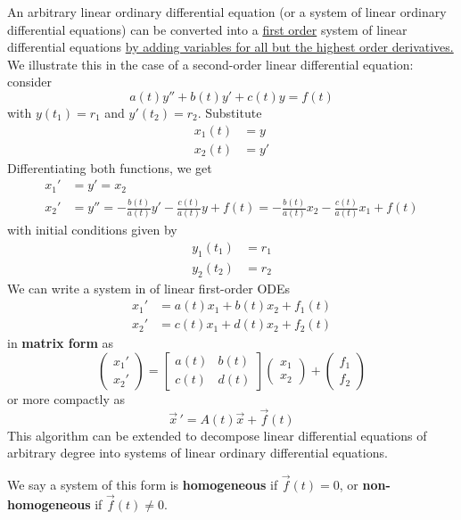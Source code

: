 \documentclass[12pt]{article}
\begin{document}
An arbitrary linear ordinary differential equation (or a system of linear ordinary differential equations) can be converted into a \uline{first order} system of linear differential equations \uline{by adding variables for all but the highest order derivatives.} We illustrate this in the case of a second-order linear differential equation: consider $$a(t)y'' + b(t)y' + c(t)y = f(t)$$ with $y(t_1) = r_1$ and $y'(t_2) = r_2$. Substitute $$\begin{aligned}
    x_1(t) &= y\\
    x_2(t) &= y'
\end{aligned}$$ Differentiating both functions, we get $$\begin{aligned}
    x_1' &= y' = x_2\\
    x_2' &= y'' = -\frac{b(t)}{a(t)}y' - \frac{c(t)}{a(t)}y + f(t) = -\frac{b(t)}{a(t)}x_2  - \frac{c(t)}{a(t)}x_1 + f(t)
\end{aligned}$$ with initial conditions given by $$\begin{aligned}
    y_1(t_1) &= r_1\\
    y_2(t_2) &= r_2
\end{aligned}$$ We can write a system in of linear first-order ODEs $$\begin{aligned}
    x_1' &= a(t)x_1 + b(t)x_2 + f_1(t)\\
    x_2' &= c(t)x_1 + d(t)x_2 + f_2(t)
\end{aligned}$$ in \textbf{matrix form} as $$\begin{pmatrix}
    x_1'\\x_2'
\end{pmatrix} = \begin{bmatrix}
    a(t) & b(t)\\
    c(t) & d(t)
\end{bmatrix} \begin{pmatrix}
    x_1\\x_2
\end{pmatrix} + \begin{pmatrix}
    f_1\\f_2
\end{pmatrix}$$ or more compactly as $$\vec{x} \, ' = A(t) \vec{x} + \vec{f}(t) $$ This algorithm can be extended to decompose linear differential equations of arbitrary degree into systems of linear ordinary differential equations.

We say a system of this form is \textbf{homogeneous} if $\vec{f}(t) = 0$, or \textbf{non-homogeneous} if $\vec{f}(t) \neq 0$.
\end{document}

